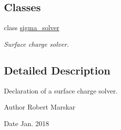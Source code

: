 \subsection*{Classes}
\begin{DoxyCompactItemize}
\item 
class \hyperlink{classsigma__solver}{sigma\+\_\+solver}
\begin{DoxyCompactList}\small\item\em Surface charge solver. \end{DoxyCompactList}\end{DoxyCompactItemize}


\subsection{Detailed Description}
Declaration of a surface charge solver. 

\begin{DoxyAuthor}{Author}
Robert Marskar 
\end{DoxyAuthor}
\begin{DoxyDate}{Date}
Jan. 2018 
\end{DoxyDate}
